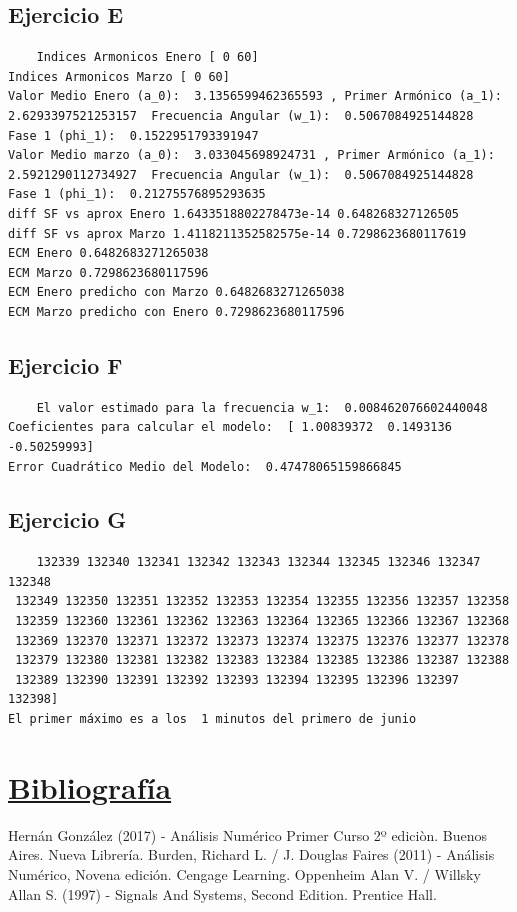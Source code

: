 \documentclass[10pt,a4paper]{article}
\numberwithin{equation}{section}
\numberwithin{figure}{section}
\numberwithin{table}{section}
\begin{document}
\subsection{Ejercicio E}
\begin{verbatim}
    Indices Armonicos Enero [ 0 60]
Indices Armonicos Marzo [ 0 60]
Valor Medio Enero (a_0):  3.1356599462365593 , Primer Armónico (a_1):  2.6293397521253157  Frecuencia Angular (w_1):  0.5067084925144828  Fase 1 (phi_1):  0.1522951793391947
Valor Medio marzo (a_0):  3.033045698924731 , Primer Armónico (a_1):  2.5921290112734927  Frecuencia Angular (w_1):  0.5067084925144828  Fase 1 (phi_1):  0.21275576895293635
diff SF vs aprox Enero 1.6433518802278473e-14 0.648268327126505
diff SF vs aprox Marzo 1.4118211352582575e-14 0.7298623680117619
ECM Enero 0.6482683271265038
ECM Marzo 0.7298623680117596
ECM Enero predicho con Marzo 0.6482683271265038
ECM Marzo predicho con Enero 0.7298623680117596
\end{verbatim}
\subsection{Ejercicio F}
\begin{verbatim}
    El valor estimado para la frecuencia w_1:  0.008462076602440048
Coeficientes para calcular el modelo:  [ 1.00839372  0.1493136  -0.50259993]
Error Cuadrático Medio del Modelo:  0.47478065159866845
\end{verbatim}
\subsection{Ejercicio G}
\begin{verbatim}
    132339 132340 132341 132342 132343 132344 132345 132346 132347 132348
 132349 132350 132351 132352 132353 132354 132355 132356 132357 132358
 132359 132360 132361 132362 132363 132364 132365 132366 132367 132368
 132369 132370 132371 132372 132373 132374 132375 132376 132377 132378
 132379 132380 132381 132382 132383 132384 132385 132386 132387 132388
 132389 132390 132391 132392 132393 132394 132395 132396 132397 132398]
El primer máximo es a los  1 minutos del primero de junio
\end{verbatim}

\section{\underline{Bibliografía}}
\begin{thebibliography}{9}

Hernán González (2017) - Análisis Numérico Primer Curso 2º ediciòn. Buenos Aires. Nueva Librería. 
Burden, Richard L. / J. Douglas Faires (2011) - Análisis Numérico, Novena edición. Cengage Learning.
Oppenheim Alan V. / Willsky Allan S. (1997) - Signals And Systems, Second Edition. Prentice Hall.
\end{thebibliography}
\end{document}
